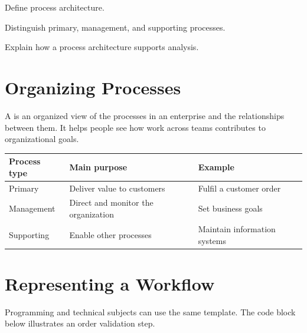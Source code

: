 
\begin{learningobjectives}
  \item Define process architecture.
  \item Distinguish primary, management, and supporting processes.
  \item Explain how a process architecture supports analysis.
\end{learningobjectives}

\section{Organizing Processes}

A  is an organized view of the processes in an
enterprise and the relationships between them. It helps people see how work
across teams contributes to organizational goals.


\begin{center}
  \begin{tabularx}{\textwidth}{@{}lYY@{}}
    \toprule
    Process type & Main purpose & Example \\
    \midrule
    Primary & Deliver value to customers & Fulfil a customer order \\
    Management & Direct and monitor the organization & Set business goals \\
    Supporting & Enable other processes & Maintain information systems \\
    \bottomrule
  \end{tabularx}
\end{center}


\section{Representing a Workflow}

Programming and technical subjects can use the same template. The code block
below illustrates an order validation step.

